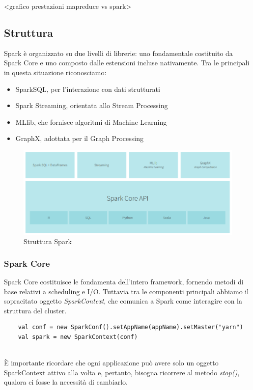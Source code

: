 <grafico prestazioni mapreduce vs spark>

\subsection{Struttura}
Spark è organizzato su due livelli di librerie: uno fondamentale costituito da Spark Core e uno composto dalle estensioni incluse nativamente. Tra le principali in questa situazione riconosciamo:
\begin{itemize}
	\item SparkSQL, per l'interazione con dati strutturati
	\item Spark Streaming, orientata allo Stream Processing
	\item MLlib, che fornisce algoritmi di Machine Learning
	\item GraphX, adottata per il Graph Processing
\end{itemize}  

\begin{figure}[h]
	\centering
	\includegraphics[scale=0.75]{Figures/spark_structure.png}
	\decoRule
	\caption[Struttura Spark]{Struttura Spark}
	\label{fig:Struttura Spark}
\end{figure}

\subsubsection{Spark Core}
Spark Core costituisce le fondamenta dell'intero framework, fornendo metodi di base relativi a scheduling e I/O. Tuttavia tra le componenti principali abbiamo il sopracitato oggetto \textit{SparkContext}, che comunica a Spark come interagire con la struttura del cluster.\\
\begin{code}
	\label{code:SparkContext}
	\begin{verbatim}
	val conf = new SparkConf().setAppName(appName).setMaster("yarn")
	val spark = new SparkContext(conf) 
	\end{verbatim}
\end{code}~\\
È importante ricordare che ogni applicazione può avere solo un oggetto SparkContext attivo alla volta e, pertanto, bisogna ricorrere al metodo \textit{stop()}, qualora ci fosse la necessità di cambiarlo.\\

